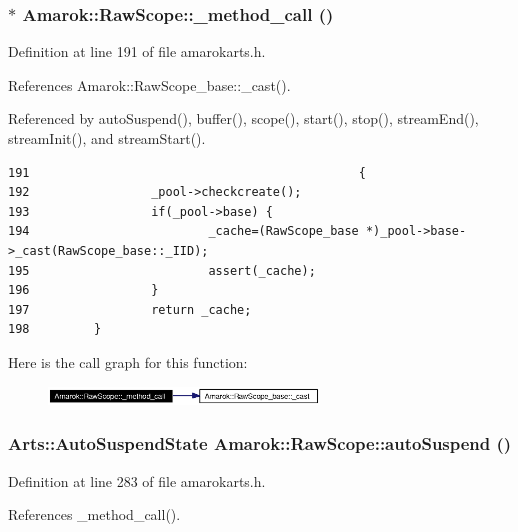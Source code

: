 \subsubsection{$\ast$ Amarok::Raw\-Scope::\_\-method\_\-call ()\hspace{0.3cm}{\tt  [inline, private]}}\label{classAmarok_1_1RawScope_Amarok_1_1RawScoped0}




Definition at line 191 of file amarokarts.h.

References Amarok::Raw\-Scope\_\-base::\_\-cast().

Referenced by auto\-Suspend(), buffer(), scope(), start(), stop(), stream\-End(), stream\-Init(), and stream\-Start().



\footnotesize\begin{verbatim}191                                              {
192                 _pool->checkcreate();
193                 if(_pool->base) {
194                         _cache=(RawScope_base *)_pool->base->_cast(RawScope_base::_IID);
195                         assert(_cache);
196                 }
197                 return _cache;
198         }
\end{verbatim}\normalsize 


Here is the call graph for this function:\begin{figure}[H]
\begin{center}
\leavevmode
\includegraphics[width=204pt]{classAmarok_1_1RawScope_Amarok_1_1RawScoped0_cgraph}
\end{center}
\end{figure}
\subsubsection{\setlength{\rightskip}{0pt plus 5cm}Arts::Auto\-Suspend\-State Amarok::Raw\-Scope::auto\-Suspend ()\hspace{0.3cm}{\tt  [inline]}}\label{classAmarok_1_1RawScope_Amarok_1_1RawScopea10}




Definition at line 283 of file amarokarts.h.

References \_\-method\_\-call().



